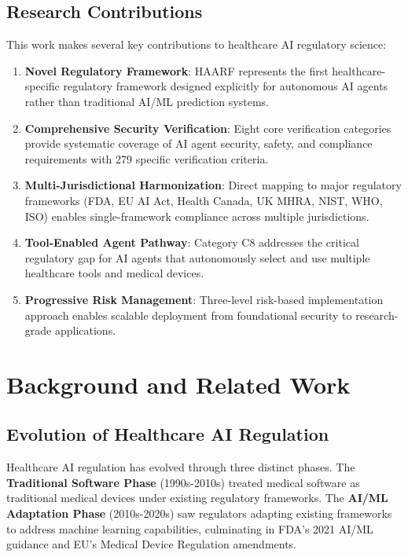 \documentclass[11pt]{article}
\begin{document}
\subsection{Research Contributions}

This work makes several key contributions to healthcare AI regulatory science:

\begin{enumerate}
    \item \textbf{Novel Regulatory Framework}: HAARF represents the first healthcare-specific regulatory framework designed explicitly for autonomous AI agents rather than traditional AI/ML prediction systems.
    
    \item \textbf{Comprehensive Security Verification}: Eight core verification categories provide systematic coverage of AI agent security, safety, and compliance requirements with 279 specific verification criteria.
    
    \item \textbf{Multi-Jurisdictional Harmonization}: Direct mapping to major regulatory frameworks (FDA, EU AI Act, Health Canada, UK MHRA, NIST, WHO, ISO) enables single-framework compliance across multiple jurisdictions.
    
    \item \textbf{Tool-Enabled Agent Pathway}: Category C8 addresses the critical regulatory gap for AI agents that autonomously select and use multiple healthcare tools and medical devices.
    
    \item \textbf{Progressive Risk Management}: Three-level risk-based implementation approach enables scalable deployment from foundational security to research-grade applications.
\end{enumerate}

\section{Background and Related Work}

\subsection{Evolution of Healthcare AI Regulation}

Healthcare AI regulation has evolved through three distinct phases. The \textbf{Traditional Software Phase} (1990s-2010s) treated medical software as traditional medical devices under existing regulatory frameworks. The \textbf{AI/ML Adaptation Phase} (2010s-2020s) saw regulators adapting existing frameworks to address machine learning capabilities, culminating in FDA's 2021 AI/ML guidance \cite{fda2021aiml} and EU's Medical Device Regulation amendments.
\end{document}
